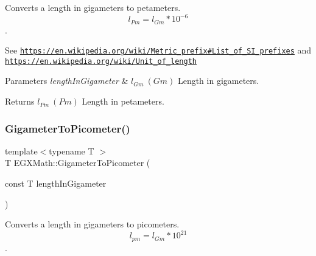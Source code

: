 Converts a length in gigameters to petameters. \[ l_{Pm}=l_{Gm} * 10^{-6} \]. 

See \href{https://en.wikipedia.org/wiki/Metric_prefix#List_of_SI_prefixes}{\tt https\+://en.\+wikipedia.\+org/wiki/\+Metric\+\_\+prefix\#\+List\+\_\+of\+\_\+\+S\+I\+\_\+prefixes} and \href{https://en.wikipedia.org/wiki/Unit_of_length}{\tt https\+://en.\+wikipedia.\+org/wiki/\+Unit\+\_\+of\+\_\+length} 
\begin{DoxyParams}{Parameters}
{\em length\+In\+Gigameter} & $ l_{Gm}\ (Gm)$ Length in gigameters. \\
\hline
\end{DoxyParams}
\begin{DoxyReturn}{Returns}
$ l_{Pm}\ (Pm)$ Length in petameters. 
\end{DoxyReturn}
\mbox{\label{group___e_g_x_math-_conversions-_length_conversions-_s_i-_gigameter-_s_i_gae9cea35a0ce747d02ec8b6cf7bfeaa7e}} 
\subsubsection{\texorpdfstring{Gigameter\+To\+Picometer()}{GigameterToPicometer()}}
{\footnotesize\ttfamily template$<$typename T $>$ \\
T E\+G\+X\+Math\+::\+Gigameter\+To\+Picometer (\begin{DoxyParamCaption}\item[{const T}]{length\+In\+Gigameter }\end{DoxyParamCaption})}



Converts a length in gigameters to picometers. \[ l_{pm}=l_{Gm} * 10^{21} \]. 

